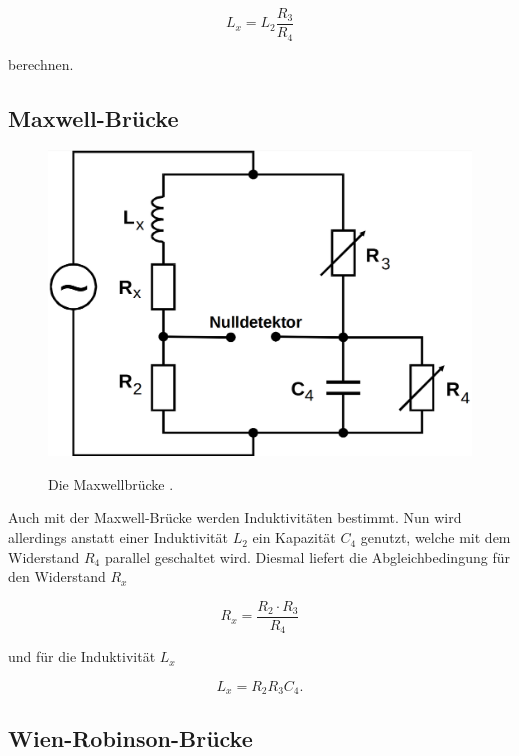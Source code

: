 \begin{equation}
    L_x = L_2 \frac{R_3}{R_4}
\end{equation}

berechnen.

\subsection{Maxwell-Brücke}

\begin{figure}
    \centering
    \includegraphics[scale=0.25]{content/Maxwellbruecke.png}
    \label{fig:maxwell}
    \caption{Die Maxwellbrücke \cite[S. 222]{anleitung}.}
\end{figure}

Auch mit der Maxwell-Brücke werden Induktivitäten bestimmt. 
Nun wird allerdings anstatt einer Induktivität $L_2$ ein Kapazität $C_4$ genutzt,
welche mit dem Widerstand $R_4$ parallel geschaltet wird. 
Diesmal liefert die Abgleichbedingung für den Widerstand $R_x$

\begin{equation}
    R_x = \frac{R_2 \cdot R_3}{R_4}
\end{equation}

und für die Induktivität $L_x$

\begin{equation}
    L_x = R_2 R_3 C_4 .
\end{equation}

\subsection{Wien-Robinson-Brücke}

